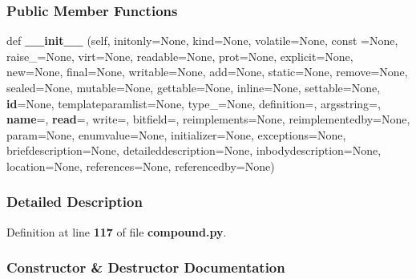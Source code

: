 \subsubsection*{Public Member Functions}
\begin{DoxyCompactItemize}
\item 
def {\bf \+\_\+\+\_\+init\+\_\+\+\_\+} (self, initonly=None, kind=None, volatile=None, const =None, raise\+\_\+=None, virt=None, readable=None, prot=None, explicit=None, new=None, final=None, writable=None, add=None, static=None, remove=None, sealed=None, mutable=None, gettable=None, inline=None, settable=None, {\bf id}=None, templateparamlist=None, type\+\_\+=None, definition=\textquotesingle{}\textquotesingle{}, argsstring=\textquotesingle{}\textquotesingle{}, {\bf name}=\textquotesingle{}\textquotesingle{}, {\bf read}=\textquotesingle{}\textquotesingle{}, write=\textquotesingle{}\textquotesingle{}, bitfield=\textquotesingle{}\textquotesingle{}, reimplements=None, reimplementedby=None, param=None, enumvalue=None, initializer=None, exceptions=None, briefdescription=None, detaileddescription=None, inbodydescription=None, location=None, references=None, referencedby=None)
\end{DoxyCompactItemize}


\subsubsection{Detailed Description}


Definition at line {\bf 117} of file {\bf compound.\+py}.



\subsubsection{Constructor \& Destructor Documentation}
